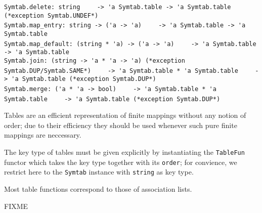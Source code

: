\begin{isabellebody}
\begin{isamarkuptext}
\begin{mldecls}
  \verb|Symtab.delete: string|\isasep\isanewline%
\verb|    -> 'a Symtab.table -> 'a Symtab.table (*exception Symtab.UNDEF*)| \\
  \verb|Symtab.map_entry: string -> ('a -> 'a)|\isasep\isanewline%
\verb|    -> 'a Symtab.table -> 'a Symtab.table| \\
  \verb|Symtab.map_default: (string * 'a) -> ('a -> 'a)|\isasep\isanewline%
\verb|    -> 'a Symtab.table -> 'a Symtab.table| \\
  \verb|Symtab.join: (string -> 'a * 'a -> 'a) (*exception Symtab.DUP/Symtab.SAME*)|\isasep\isanewline%
\verb|    -> 'a Symtab.table * 'a Symtab.table|\isasep\isanewline%
\verb|    -> 'a Symtab.table (*exception Symtab.DUP*)| \\
  \verb|Symtab.merge: ('a * 'a -> bool)|\isasep\isanewline%
\verb|    -> 'a Symtab.table * 'a Symtab.table|\isasep\isanewline%
\verb|    -> 'a Symtab.table (*exception Symtab.DUP*)|
  \end{mldecls}%
\end{isamarkuptext}%
\isamarkuptrue%
%
\begin{isamarkuptext}%
Tables are an efficient representation of finite mappings without
  any notion of order;  due to their efficiency they should be used
  whenever such pure finite mappings are neccessary.

  The key type of tables must be given explicitly by instantiating
  the \verb|TableFun| functor which takes the key type
  together with its \verb|order|; for convience, we restrict
  here to the \verb|Symtab| instance with \verb|string|
  as key type.

  Most table functions correspond to those of association lists.%
\end{isamarkuptext}%
\isamarkuptrue%
%
\isamarkuptrue%
%
\isamarkuptrue%
%
\begin{isamarkuptext}%
FIXME%
\end{isamarkuptext}%
\isamarkuptrue%
%
\isadelimtheory
%
\endisadelimtheory
%
\isatagtheory
{}\isamarkupfalse%
%
\endisatagtheory
{\isafoldtheory}%
%
\isadelimtheory
%
\endisadelimtheory
\isanewline
\end{isabellebody}%
